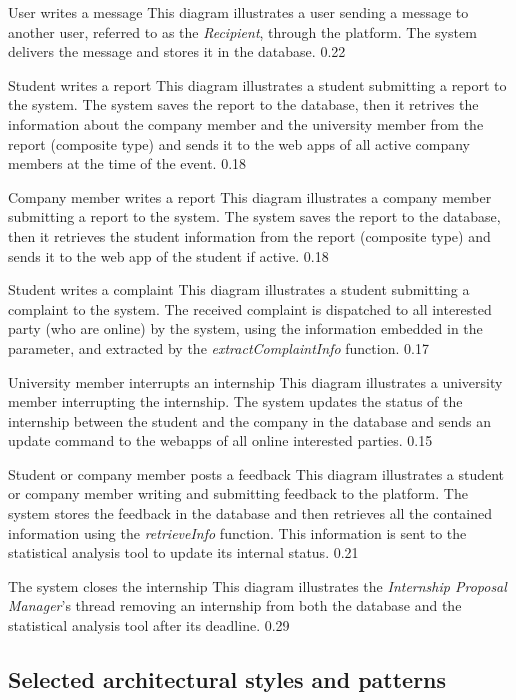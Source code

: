 \runtimeview
{User writes a message}
{This diagram illustrates a user sending a message to another user, referred to as the \textit{Recipient}, through the platform. The system delivers the message and stores it in the database.}
{0.22}

\runtimeview
{Student writes a report}
{This diagram illustrates a student submitting a report to the system. The system saves the report to the database, then it retrives the information about the company member and the university member from the report (composite type) and sends it to the web apps of all active company members at the time of the event.}
{0.18}

\runtimeview
{Company member writes a report}
{This diagram illustrates a company member submitting a report to the system. 
The system saves the report to the database, then it retrieves the student information from the report (composite type) and sends it to the web app of the student if active.}
{0.18}

\runtimeview
{Student writes a complaint}
{This diagram illustrates a student submitting a complaint to the system. The received complaint is dispatched to all interested party (who are online) by the system, using the information embedded in the parameter, and extracted by the \textit{extractComplaintInfo} function.}
{0.17}

\runtimeview
{University member interrupts an internship}
{This diagram illustrates a university member interrupting the internship. The system updates the status of the internship between the student and the company in the database and sends an update command to the webapps of all online interested parties.}
{0.15}

\runtimeview
{Student or company member posts a feedback}
{This diagram illustrates a student or company member writing and submitting feedback to the platform. The system stores the feedback in the database and then retrieves all the contained information using the \textit{retrieveInfo} function. This information is sent to the statistical analysis tool to update its internal status.}
{0.21}

\runtimeview
{The system closes the internship}
{This diagram illustrates the \textit{Internship Proposal Manager}'s thread removing an internship from both the database and the statistical analysis tool after its deadline.}
{0.29}

\subsection{Selected architectural styles and patterns}
